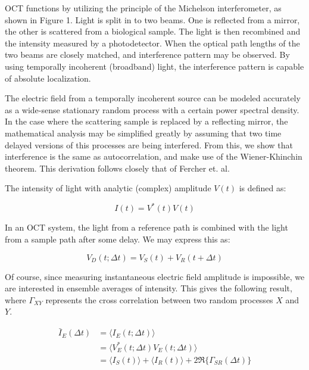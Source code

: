 OCT functions by utilizing the principle of the Michelson interferometer, as shown in Figure 1. Light is split in to two beams. One is reflected from a mirror, the other is scattered from a biological sample. The light is then recombined and the intensity measured by a photodetector. When the optical path lengths of the two beams are closely matched, and interference pattern may be observed. By using temporally incoherent (broadband) light, the interference pattern is capable of absolute localization.

The electric field from a temporally incoherent source can be modeled accurately as a wide-sense stationary random process with a certain power spectral density. \cite{Bouma} In the case where the scattering sample is replaced by a reflecting mirror, the mathematical analysis may be simplified greatly by assuming that two time delayed versions of this processes are being interfered. From this, we show that interference is the same as autocorrelation, and make use of the Wiener-Khinchin theorem. This derivation follows closely that of Fercher et. al. \cite{fercher}

The intensity of light with analytic (complex) amplitude $V(t)$ is defined as:

\begin{equation}
I(t) = V^*(t)V(t)
\end{equation}

In an OCT system, the light from a reference path is combined with the light from a sample path after some delay. We may express this as:

\begin{equation}
V_D(t; \Delta t) = V_S(t) + V_R(t + \Delta t)
\end{equation}

Of course, since measuring instantaneous electric field amplitude is impossible, we are interested in ensemble averages of intensity. This gives the following result, where $\Gamma_{XY}$ represents the cross correlation between two random processes $X$ and $Y$.

\begin{equation}
\begin{aligned}
\bar{I}_E(\Delta t) & =  \langle I_E(t; \Delta t) \rangle \\
& =  \langle V^*_E(t; \Delta t) V_E(t; \Delta t) \rangle \\
& =  \langle I_S(t) \rangle + \langle I_R(t) \rangle + 2 \Re \{\Gamma_{SR} (\Delta t) \}
\end{aligned}
\end{equation}

